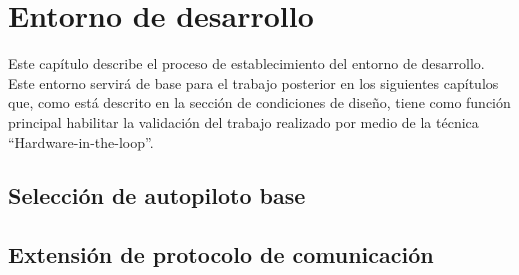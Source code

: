 \chapter{Entorno de desarrollo}

Este capítulo describe el proceso de establecimiento del entorno de desarrollo. Este entorno servirá de base para el trabajo posterior en los siguientes capítulos que, como está descrito en la sección de condiciones de diseño, tiene como función principal habilitar la validación del trabajo realizado por medio de la técnica ``Hardware-in-the-loop''.

\section{Selección de autopiloto base}



\section{Extensión de protocolo de comunicación}
